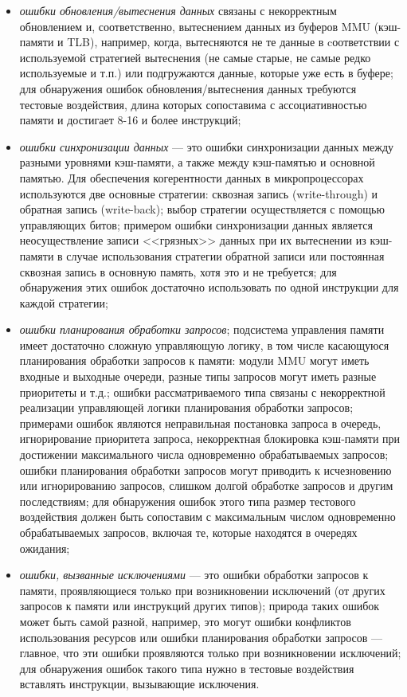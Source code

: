 \begin{itemize}
  \item \emph{ошибки обновления/вытеснения данных} связаны с некорректным обновлением и, соответственно, вытеснением данных из буферов MMU (кэш-памяти и TLB), например, когда, вытесняются не те данные в cоответствии с используемой стратегией вытеснения (не самые старые, не самые редко используемые и т.п.) или подгружаются данные, которые уже есть в буфере; для обнаружения ошибок обновления/вытеснения данных требуются тестовые воздействия, длина которых сопоставима с ассоциативностью памяти и достигает 8-16 и более инструкций;
  \item \emph{ошибки синхронизации данных} --- это ошибки синхронизации данных между разными уровнями кэш-памяти, а также между кэш-памятью и основной памятью. Для обеспечения когерентности данных в микропроцессорах используются две основные стратегии: сквозная запись (write-through) и обратная запись (write-back); выбор стратегии осуществляется с помощью управляющих битов; примером ошибки синхронизации данных является неосуществление записи <<грязных>> данных при их вытеснении из кэш-памяти в случае использования стратегии обратной записи или постоянная сквозная запись в основную память, хотя это и не требуется; для обнаружения этих ошибок достаточно использовать по одной инструкции для каждой стратегии;
  \item \emph{ошибки планирования обработки запросов}; подсистема управления памяти имеет достаточно сложную управляющую логику, в том числе касающуюся планирования обработки запросов к памяти: модули MMU могут иметь входные и выходные очереди, разные типы запросов могут иметь разные приоритеты и т.д.; ошибки рассматриваемого типа связаны с некорректной реализации управляющей логики планирования обработки запросов; примерами ошибок являются неправильная постановка запроса в очередь, игнорирование приоритета запроса, некорректная блокировка кэш-памяти при достижении максимального числа одновременно обрабатываемых запросов; ошибки планирования обработки запросов могут приводить к исчезновению или игнорированию запросов, слишком долгой обработке запросов и другим последствиям; для обнаружения ошибок этого типа размер тестового воздействия должен быть сопоставим с максимальным числом одновременно обрабатываемых запросов, включая те, которые находятся в очередях ожидания;
  \item \emph{ошибки, вызванные исключениями} --- это ошибки обработки запросов к памяти, проявляющиеся только при возникновении исключений (от других запросов к памяти или инструкций других типов); природа таких ошибок может быть самой разной, например, это могут ошибки конфликтов использования ресурсов или ошибки планирования обработки запросов --- главное, что эти ошибки проявляются только при возникновении исключений; для обнаружения ошибок такого типа нужно в тестовые воздействия вставлять инструкции, вызывающие исключения.
\end{itemize}

